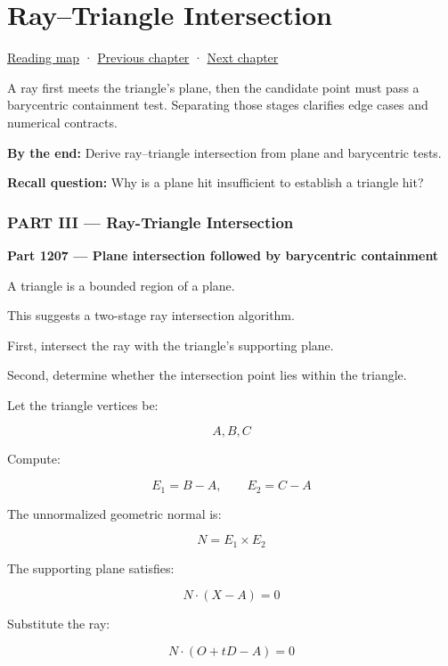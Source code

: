 \chapter{Ray--Triangle Intersection}\label{04-visual-computing-ii-ch024-raytriangle-intersection}\hypertarget{04-visual-computing-ii-ch024}{}\label{stagechapter:04-visual-computing-ii-ch024}

\hyperref[volume-reading-map]{Reading map} · \hyperref[04-visual-computing-ii-ch023-mesh-topology-and-connectivity]{Previous chapter} · \hyperref[04-visual-computing-ii-ch025-sat-for-triangle-and-convex-polygon-tests]{Next chapter}

A ray first meets the triangle's plane, then the candidate point must pass a barycentric containment test. Separating those stages clarifies edge cases and numerical contracts.

\textbf{By the end:} Derive ray--triangle intersection from plane and barycentric tests.

\textbf{Recall question:} Why is a plane hit insufficient to establish a triangle hit?

\subsection{PART III --- Ray-Triangle Intersection}\label{04-visual-computing-ii-ch024-part-iii-ray-triangle-intersection}

\textbf{Part 1207 --- Plane intersection followed by barycentric containment}

A triangle is a bounded region of a plane.

This suggests a two-stage ray intersection algorithm.

First, intersect the ray with the triangle's supporting plane.

Second, determine whether the intersection point lies within the triangle.

Let the triangle vertices be:

\[
A,B,C
\]

Compute:

\[
E_1=B-A,\qquad E_2=C-A
\]

The unnormalized geometric normal is:

\[
N=E_1\times E_2
\]

The supporting plane satisfies:

\[
N\cdot(X-A)=0
\]

Substitute the ray:

\[
N\cdot(O+tD-A)=0
\]

